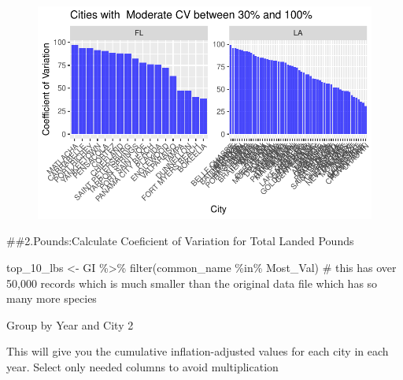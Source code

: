 \documentclass[
  letterpaper,
  DIV=11,
  numbers=noendperiod]{scrartcl}
\newenvironment{Shaded}{\begin{snugshade}}{\end{snugshade}}
\newcommand{\CommentTok}[1]{\textcolor[rgb]{0.37,0.37,0.37}{#1}}
\newcommand{\FunctionTok}[1]{\textcolor[rgb]{0.28,0.35,0.67}{#1}}
\newcommand{\NormalTok}[1]{\textcolor[rgb]{0.00,0.23,0.31}{#1}}
\newcommand{\OtherTok}[1]{\textcolor[rgb]{0.00,0.23,0.31}{#1}}
\newcommand{\SpecialCharTok}[1]{\textcolor[rgb]{0.37,0.37,0.37}{#1}}
\begin{document}
\begin{figure}[H]

{\centering \includegraphics{CV_Communities2_files/figure-pdf/unnamed-chunk-12-1.pdf}

}

\end{figure}

\#\#2.Pounds:Calculate Coeficient of Variation for Total Landed Pounds

\begin{Shaded}
\begin{Highlighting}[]
\NormalTok{top\_10\_lbs }\OtherTok{\textless{}{-}}\NormalTok{ GI }\SpecialCharTok{\%\textgreater{}\%}
  \FunctionTok{filter}\NormalTok{(common\_name }\SpecialCharTok{\%in\%}\NormalTok{ Most\_Val) }\CommentTok{\# this has over 50,000 records which is much smaller than the original data file which has so many more species}
\end{Highlighting}
\end{Shaded}

Group by Year and City 2

This will give you the cumulative inflation-adjusted values for each
city in each year. Select only needed columns to avoid multiplication
\end{document}
